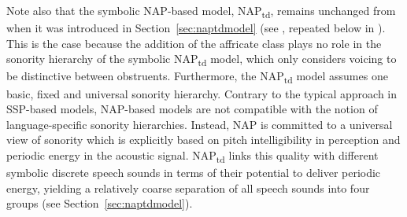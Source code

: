 Note also that the symbolic NAP-based model, NAP\textsubscript{td}, remains unchanged from when it was introduced in Section~\ref{sec:naptdmodel} (see , repeated below in ). This is the case because the addition of the affricate class plays no role in the sonority hierarchy of the symbolic NAP\textsubscript{td} model, which only considers voicing to be distinctive between obstruents. Furthermore, the NAP\textsubscript{td} model assumes one basic, fixed and universal sonority hierarchy. Contrary to the typical approach in SSP-based models, NAP-based models are not compatible with the notion of language-specific sonority hierarchies.
Instead, NAP is committed to a universal view of sonority which is explicitly based on pitch intelligibility in perception and periodic energy in the acoustic signal. NAP\textsubscript{td} links this quality with different symbolic discrete speech sounds in terms of their potential to deliver periodic energy, yielding a relatively coarse separation of all speech sounds into four groups (see Section~\ref{sec:naptdmodel}).

